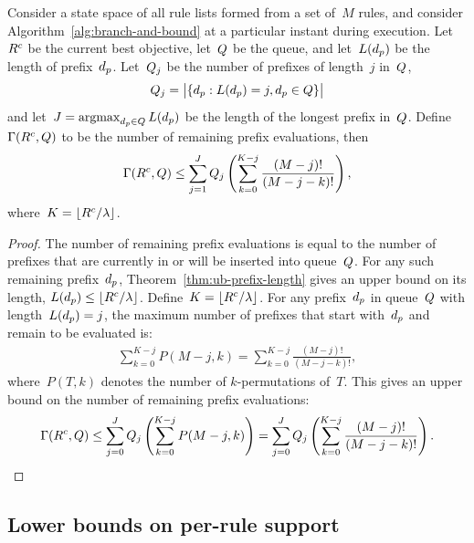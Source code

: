 \begin{proposition}
\label{thm:remaining-eval-coarse}
Consider a state space of all rule lists formed from a set of~$M$ rules,
and consider Algorithm~\ref{alg:branch-and-bound} at a particular instant
during execution.
%
Let~${R^c}$ be the current best objective, let~$Q$ be the queue,
and let~$L(d_p)$ be the length of prefix~$d_p$.
%
Let~$Q_j$ be the number of prefixes of length~$j$ in~$Q$,
\begin{align}
\Queue_j = \big | \{ \Prefix : L(\Prefix) = j, \Prefix \in \Queue \} \big |
\end{align}
and let~${J = \operatorname*{argmax}_{d_p \in Q} L(d_p)}$
be the length of the longest prefix in~$Q$.
%
Define~${\Gamma({R^c}, Q)}$ to be the number of remaining
prefix evaluations, then
\begin{align}
\Remaining(\CurrentObj, \Queue)
\le \sum_{j=1}^J \Queue_j \left( \sum_{k=0}^{K-j} \frac{(M-j)!}{(M-j - k)!} \right),
\end{align}
where~${K = \lfloor {R^c} / {\lambda} \rfloor}$.
\end{proposition}

\begin{proof}
The number of remaining prefix evaluations is equal to the number of
prefixes that are currently in or will be inserted into queue~$Q$.
%
For any such remaining prefix~$d_p$,
Theorem~\ref{thm:ub-prefix-length} gives an upper bound on its length,
${L(d_p) \le \lfloor {R^c} / {\lambda} \rfloor}$.
%
Define~${K = \lfloor {R^c} / {\lambda} \rfloor}$.
%
For any prefix~$d_p$ in queue~$Q$ with length~${L(d_p) = j}$,
the maximum number of prefixes that start with~$d_p$
and remain to be evaluated is:
\begin{align}
\sum_{k=0}^{K-j} P(M-j, k) = \sum_{k=0}^{K-j} \frac{(M-j)!}{(M-j - k)!},
\end{align}
where~${P(T, k)}$ denotes the number of $k$-permutations of~$T$.
%
This gives an upper bound on the number of remaining prefix evaluations:
\begin{align}
\Remaining(\CurrentObj, \Queue)
\le \sum_{j=0}^J \Queue_j \left( \sum_{k=0}^{K-j} P(M-j, k) \right)
= \sum_{j=0}^J \Queue_j \left( \sum_{k=0}^{K-j} \frac{(M-j)!}{(M-j - k)!} \right).
\end{align}
\end{proof}

\subsection{Lower bounds on per-rule support}
\label{sec:lb-support}

